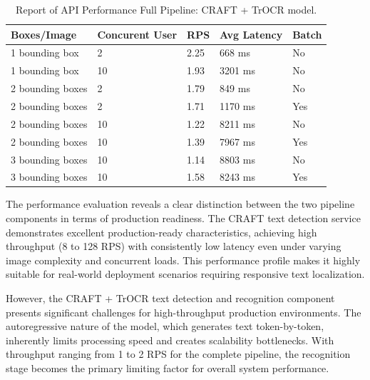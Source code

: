 {\begin{table}[H]
    \centering
    \caption{Report of API Performance Full Pipeline: CRAFT + TrOCR model. }
    \renewcommand{\arraystretch}{1.5}
    \begin{tabular}{|p{3.5cm}|p{3.0cm}|p{3.0cm}|p{3.0cm}|p{1.7cm}|}
    \hline
    \textbf{Boxes/Image} & \textbf{Concurent User} & \textbf{RPS} & \textbf{Avg Latency} & \textbf{Batch}\\
    \hline
    1 bounding box & 2 & 2.25 & 668 ms & No\\
    \hline
    1 bounding box & 10 & 1.93 & 3201 ms & No\\
    \hline
    2 bounding boxes & 2 & 1.79 & 849 ms & No\\
    \hline
    2 bounding boxes & 2 & 1.71 & 1170 ms & Yes\\
    \hline
    2 bounding boxes & 10 & 1.22 & 8211 ms & No\\
    \hline
    2 bounding boxes & 10 & 1.39 & 7967 ms  & Yes\\
    \hline
    3 bounding boxes & 10 & 1.14 & 8803 ms & No\\
    \hline
    3 bounding boxes & 10 & 1.58 & 8243 ms & Yes\\
    \hline
    \end{tabular}
    \label{tab:api_performance_evaluation}
\end{table}


The performance evaluation reveals a clear distinction between the two pipeline components in terms of production readiness. The {\englishfont\selectfont CRAFT} text detection service demonstrates excellent production-ready characteristics, achieving high throughput (8 to 128 RPS) with consistently low latency even under varying image complexity and concurrent loads. This performance profile makes it highly suitable for real-world deployment scenarios requiring responsive text localization.

However, the {\englishfont\selectfont CRAFT + TrOCR} text detection and recognition component presents significant challenges for high-throughput production environments. The autoregressive nature of the model, which generates text token-by-token, inherently limits processing speed and creates scalability bottlenecks. With throughput ranging from 1 to 2 RPS for the complete pipeline, the recognition stage becomes the primary limiting factor for overall system performance.

\vspace{0.5cm}

}
